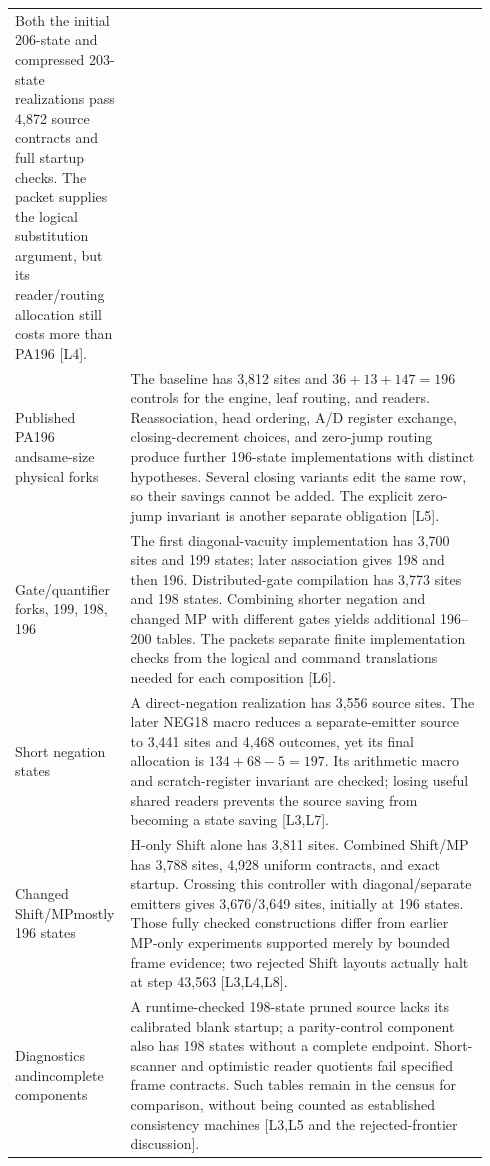 {\begin{longtable}{@{}p{0.20\linewidth}p{0.74\linewidth}@{}}
Both the initial 206-state and compressed 203-state realizations pass
4,872 source contracts and full startup checks. The packet supplies the
logical substitution argument, but its reader/routing allocation still
costs more than PA196 [L4].\\[4pt]
Published PA196 and\newline same-size physical forks &
The baseline has 3,812 sites and $36+13+147=196$ controls for the
engine, leaf routing, and readers. Reassociation, head ordering,
A/D register exchange, closing-decrement choices, and zero-jump routing
produce further 196-state implementations with distinct hypotheses.
Several closing variants edit the same row, so their savings cannot be
added. The explicit zero-jump invariant is another separate obligation
[L5].\\[4pt]
Gate/quantifier forks\newline 200, 199, 198, 196 &
The first diagonal-vacuity implementation has 3,700 sites and 199 states;
later association gives 198 and then 196. Distributed-gate compilation
has 3,773 sites and 198 states. Combining shorter negation and changed MP
with different gates yields additional 196--200 tables. The packets
separate finite implementation checks from the logical and command
translations needed for each composition [L6].\\[4pt]
Short negation\newline 197 states &
A direct-negation realization has 3,556 source sites. The later NEG18
macro reduces a separate-emitter source to 3,441 sites and 4,468 outcomes,
yet its final allocation is $134+68-5=197$. Its arithmetic macro and
scratch-register invariant are checked; losing useful shared readers
prevents the source saving from becoming a state saving [L3,L7].\\[4pt]
Changed Shift/MP\newline mostly 196 states &
H-only Shift alone has 3,811 sites. Combined Shift/MP has 3,788 sites,
4,928 uniform contracts, and exact startup. Crossing this controller
with diagonal/separate emitters gives 3,676/3,649 sites, initially at
196 states. Those fully checked constructions differ from earlier
MP-only experiments supported merely by bounded frame evidence;
two rejected Shift layouts actually halt at step 43,563 [L3,L4,L8].\\[4pt]
Diagnostics and\newline incomplete components &
A runtime-checked 198-state pruned source lacks its calibrated blank
startup; a parity-control component also has 198 states without a
complete endpoint. Short-scanner and optimistic reader quotients fail
specified frame contracts. Such tables remain in the census for
comparison, without being counted as established consistency machines
[L3,L5 and the rejected-frontier discussion].\\
\end{longtable}
}

